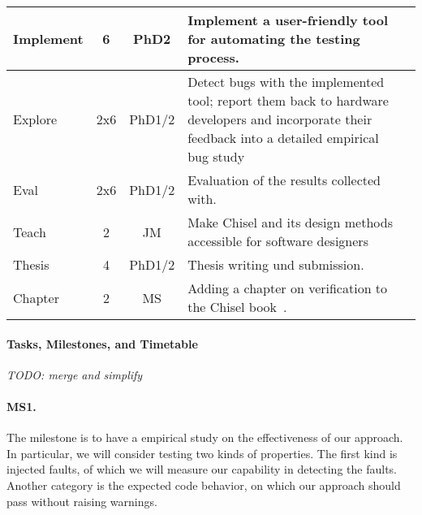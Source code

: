 \documentclass[fleqn,12pt]{article}
\newcommand{\todo}[1]{{\it TODO: #1}}
\begin{document}
\begin{table*}
{\begin{center}
\begin{tabular}{lccp{110mm}l}
      Implement              & 6   & PhD2      & Implement a user-friendly tool for automating the testing process.                            \\
      \midrule
      Explore                & 2x6 & PhD1/2    & Detect bugs with the implemented tool; report them back to hardware developers and incorporate their feedback into a detailed
      empirical bug study                                                                                                                       \\
      Eval                   & 2x6 & PhD1/2    & Evaluation of the results collected with.                                                     \\
      Teach                 &  2  & JM            & Make Chisel and its design methods accessible for software designers \\
      Thesis                 & 4   & PhD1/2    & Thesis writing und submission.                                                                \\
      \midrule
      Chapter                & 2   & MS        & Adding a chapter on verification to the Chisel book~\cite{chisel:book}.                       \\
      \bottomrule
    \end{tabular}
  \end{center}
}
\end{table*}





\paragraph*{Tasks, Milestones, and Timetable}

\todo{merge and simplify}

\paragraph{MS1.} The milestone is to have a empirical study on the effectiveness of our approach. In particular,  we will consider testing  two kinds of properties. The first kind is injected faults, of which we will measure our capability in detecting the faults. Another category is the expected code behavior, on which our approach should  pass without raising  warnings. 
\end{document}
